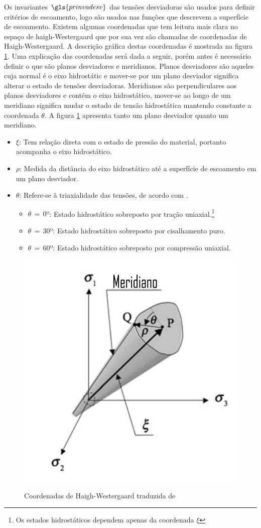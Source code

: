 Os invariantes $\gls{prinvadesv}$ das tensões desviadoras são usados para definir critérios de escoamento, logo são usados nas funções que descrevem a superfície de escoamento. Existem algumas coordenadas que tem leitura mais clara no espaço de haigh-Westergaard que por sua vez são chamadas de coordenadas de Haigh-Westergaard. A descrição gráfica destas coordenadas é mostrada na figura \ref{fig:coordhaigh}. Uma explicação das coordenadas será dada a seguir, porém antes é necessário definir o que são planos desviadores e meridianos. Planos desviadores são aqueles cuja normal é o eixo hidrostátic e mover-se por um plano desviador significa alterar o estado de tensões desviadoras. Meridianos são perpendiculares aos planos desviadores e contém o eixo hidrostático, mover-se ao longo de um meridiano significa mudar o estado de tensão hidrostática mantendo constante a coordenada $\theta$. A figura \ref{fig:coordhaigh} apresenta tanto um plano desviador quanto um meridiano. \\

\begin{itemize}
    \item $ \xi $: Tem relação direta com o estado de pressão do material, portanto acompanha o eixo hidrostático.
    \item $ \rho $: Medida da distância do eixo hidrostático até a superfície de escoamento em um plano desviador.
    \item $ \theta $: Refere-se à triaxialidade das tensões, de acordo com \cite{hiermaier_2008}.
    \begin{itemize}
        \item $\theta \, = \, 0 º$: Estado hidrostático sobreposto por tração uniaxial.\footnote{Os estados hidrostáticos dependem apenas da coordenada $\xi$}
        \item $\theta \, = \, 30 º$: Estado hidrostático sobreposto por cisalhamento puro.
        \item $\theta \, = \, 60 º$: Estado hidrostático sobreposto por compressão uniaxial. 
    \end{itemize}
\end{itemize}


\begin{figure}[H]
    \centering
    \caption{Coordenadas de Haigh-Westergaard traduzida de \cite{hiermaier_2008}}
    \includegraphics[width=0.5\linewidth]{images/Haigh_Wester.png}
    \label{fig:coordhaigh}
\end{figure}

